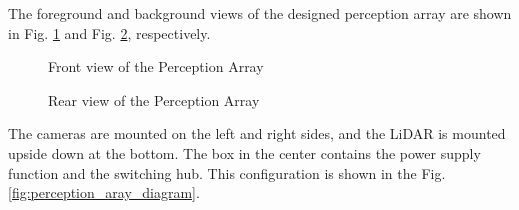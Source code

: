 \documentclass[lettersize,journal]{IEEEtran}
\begin{document}
The foreground and background views of the designed perception array are shown in Fig. \ref{fig:perception_array_front} and Fig. \ref{fig:perception_array_back}, respectively.

\begin{figure}[htbp]
  \begin{center}
  \end{center}
  \caption{Front view of the Perception Array}
  \label{fig:perception_array_front}
\end{figure}

\begin{figure}[htbp]
  \begin{center}
  \end{center}
  \caption{Rear view of the Perception Array}
  \label{fig:perception_array_back}
\end{figure}

The cameras are mounted on the left and right sides, and the LiDAR is mounted upside down at the bottom.
The box in the center contains the power supply function and the switching hub.
This configuration is shown in the Fig. \ref{fig:perception_aray_diagram}.
\end{document}
